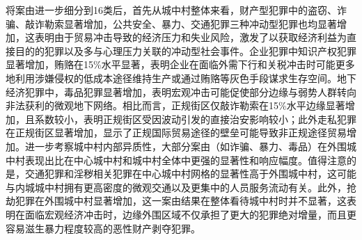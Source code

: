 \documentclass[a4paper,12pt]{report}
\begin{document}
将案由进一步细分到16类后，首先从城中村整体来看，财产型犯罪中的盗窃、诈骗、敲诈勒索显著增加，公共安全、暴力、交通犯罪三种冲动型犯罪也均显著增加，这表明由于贸易冲击导致的经济压力和失业风险，激发了以获取经济利益为直接目的的犯罪以及多与心理压力关联的冲动型社会事件。企业犯罪中知识产权犯罪显著增加，贿赂在15\%水平显著，表明企业在面临外需下行和关税冲击时可能更多地利用涉嫌侵权的低成本途径维持生产或通过贿赂等灰色手段谋求生存空间。地下经济犯罪中，毒品犯罪显著增加，表明宏观冲击可能促使部分边缘与弱势人群转向非法获利的微观地下网络。相比而言，正规街区仅敲诈勒索在15\%水平边缘显著增加，且系数较小，表明正规街区受因波动引发的直接治安影响较小；此外走私犯罪在正规街区显著增加，显示了正规国际贸易途径的壁垒可能导致非正规途径贸易增加。进一步考察城中村内部异质性，大部分案由（如诈骗、暴力、毒品）在外围城中村表现出比在中心城中村和城中村全体中更强的显著性和响应幅度。值得注意的是，交通犯罪和淫秽相关犯罪在中心城中村网格的显著性高于外围城中村，这可能与内城城中村拥有更高密度的微观交通以及更集中的人员服务流动有关。此外，抢劫犯罪在外围城中村显著增加，这一案由结果在整体看待城中村时并不显著，这表明在面临宏观经济冲击时，边缘外围区域不仅承担了更大的犯罪绝对增量，而且更容易滋生暴力程度较高的恶性财产剥夺犯罪。
\end{document}
